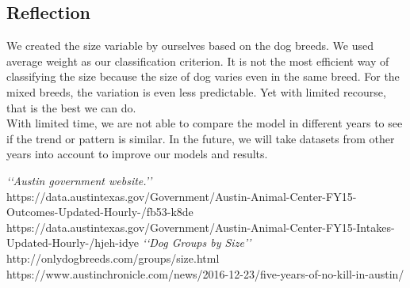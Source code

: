 \documentclass[12pt]{article}
\begin{document}
\begin{flushleft}
\subsection{Reflection}
We created the size variable by ourselves based on the dog breeds. We used average weight as our classification criterion. It is not the most efficient way of classifying the size because the size of dog varies even in the same breed. For the mixed breeds, the variation is even less predictable.
Yet with limited recourse, that is the best we can do. \\
With limited time, we are not able to compare the model in different years to see if the trend or pattern is similar. In the future, we will take datasets from other years into account to improve our models and results.\\
\newpage
\begin{thebibliography}{9}
\textit{\lq\lq Austin government website.\rq\rq}\\
https://data.austintexas.gov/Government/Austin-Animal-Center-FY15-Outcomes-Updated-Hourly-/fb53-k8de \\
https://data.austintexas.gov/Government/Austin-Animal-Center-FY15-Intakes-Updated-Hourly-/hjeh-idye
\textit{\lq\lq Dog Groups by Size\rq\rq}\\
http://onlydogbreeds.com/groups/size.html
https://www.austinchronicle.com/news/2016-12-23/five-years-of-no-kill-in-austin/
\end{thebibliography}
\end{flushleft}
\end{document}
